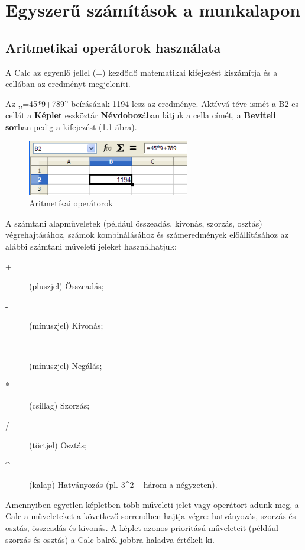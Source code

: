 \chapter{Egyszerű számítások a munkalapon}
\thispagestyle{empty}

\section{Aritmetikai operátorok használata}

A Calc az egyenlő jellel (=) kezdődő matematikai
kifejezést kiszámítja és a cellában az eredményt
megjeleníti.

Az ,,=45*9+789'' beírásának 1194
lesz az eredménye. Aktívvá téve ismét a B2-es cellát a
\textbf{Képlet} eszköztár \textbf{Névdoboz}ában látjuk a
cella címét, a \textbf{Beviteli sor}ban pedig a kifejezést 
(\ref{AritmetikaiOperátorok} ábra).

\begin{figure}[!h]
\begin{center}
\includegraphics[width=7.094cm]{oocalcv1-img20.png}
\caption{Aritmetikai operátorok}\label{AritmetikaiOperátorok}
\end{center}
\end{figure}

A számtani alapműveletek (például összeadás, kivonás,
szorzás, osztás) végrehajtásához, számok
kombinálásához és számeredmények előállításához
az alábbi számtani műveleti jeleket használhatjuk:

\begin{description}
\item [+] (pluszjel) Összeadás;
\item [-] (mínuszjel) Kivonás; 
\item [-] (mínuszjel) Negálás; 
\item [*] (csillag) Szorzás; 
\item [/] (törtjel) Osztás;
\item [\textasciicircum] (kalap) Hatványozás (pl. 3\^{}2 --  három a négyzeten). 
\end{description}

Amennyiben egyetlen képletben több műveleti jelet vagy
operátort adunk meg, a Calc a műveleteket a következő
sorrendben hajtja végre: hatványozás, szorzás és osztás,
összeadás és kivonás. A képlet azonos prioritású
műveleteit (például szorzás és osztás) a  Calc balról
jobbra haladva értékeli ki.

